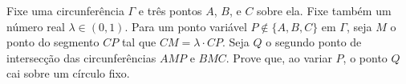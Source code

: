 Fixe uma circunferência $\Gamma$ e três pontos $A$, $B$, e $C$ sobre ela.
Fixe também um número real $\lambda \in(0,1)$.
Para um ponto variável $P \not\in \{A, B, C\}$ em $\Gamma$, seja $M$ o ponto do segmento $CP$ tal que $CM = \lambda \cdot CP$.
Seja $Q$ o segundo ponto de intersecção das circunferências $AMP$ e $BMC$.
Prove que, ao variar $P$, o ponto $Q$ cai sobre um círculo fixo.
